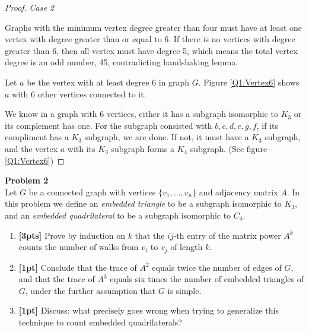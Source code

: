 \documentclass[12pt]{article}
\newenvironment{problem}[2][Problem]
    { \begin{mdframed}[backgroundcolor=gray!20] \textbf{#1 #2} \\}
    {  \end{mdframed}}
\begin{document}
\begin{proof}
\emph{Case 2}

Graphs with the minimum vertex degree greater than four must have at least one vertex with degree greater than or equal to 6. 
If there is no vertices with degree greater than 6, then all vertex must have degree 5, which means the total vertex degree is an odd number, 45, contradicting handshaking lemma.

Let $a$ be the vertex with at least degree $6$ in graph $G$. Figure \ref{Q1:Vertex6} shows $a$ with 6 other vertices connected to it.

We know in a graph with 6 vertices, either it has a subgraph isomorphic to $K_3$ or its complement has one. For the subgraph consisted with $b,c,d,e,g,f$, if its compliment has a $K_3$ subgraph, we are done. If not, it must have a $K_3$ subgraph, and the vertex $a$ with its $K_3$ subgraph forms a $K_4$ subgraph. (See figure \ref{Q1:Vertex6})

\end{proof}

\newpage

\begin{problem}{2}
Let $G$ be a connected graph with vertices $\{v_1,\ldots,v_n\}$ and adjacency matrix $A$.
In this problem we define an \emph{embedded triangle} to be a subgraph isomorphic to $K_3$, and an \emph{embedded quadrilateral} to be a subgraph isomorphic to $C_4$.

\begin{enumerate}[label=\alph*)]
    \item \textbf{[3pts]} Prove by induction on $k$ that the $ij$-th entry of the matrix power $A^k$ counts the number of walks from $v_i$ to $v_j$ of length $k$.
    \item \textbf{[1pt]} Conclude that the trace of $A^2$ equals twice the number of edges of $G$, and that the trace of $A^3$ equals six times the number of embedded triangles of $G$, under the further assumption that $G$ is simple.
    \item \textbf{[1pt]} Discuss: what precisely goes wrong when trying to generalize this technique to count embedded quadrilaterals?
\end{enumerate}

\end{problem}
\end{document}
